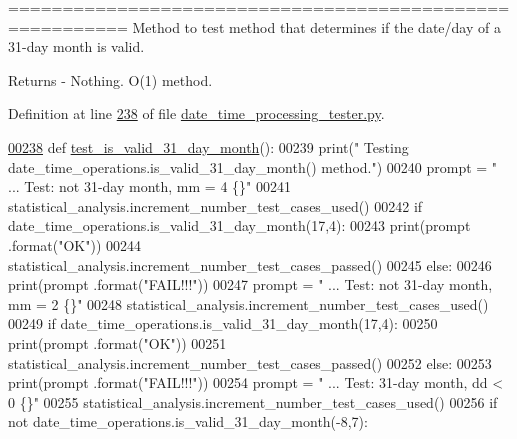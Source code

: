 ========================================================= Method to test method that determines if the date/day of a 31-\/day month is valid. 

\begin{DoxyReturn}{Returns}
-\/ Nothing. O(1) method. 
\end{DoxyReturn}


Definition at line \hyperlink{date__time__processing__tester_8py_source_l00238}{238} of file \hyperlink{date__time__processing__tester_8py_source}{date\+\_\+time\+\_\+processing\+\_\+tester.\+py}.


\begin{DoxyCode}
\hypertarget{classutilities_1_1date__time__processing__tester_1_1date__time__operations__tester_l00238}{}\hyperlink{classutilities_1_1date__time__processing__tester_1_1date__time__operations__tester_a6ee9fbb6e07f1ca66334315e61876d8e}{00238}     \textcolor{keyword}{def }\hyperlink{classutilities_1_1date__time__processing__tester_1_1date__time__operations__tester_a6ee9fbb6e07f1ca66334315e61876d8e}{test\_is\_valid\_31\_day\_month}():
00239         print(\textcolor{stringliteral}{" Testing date\_time\_operations.is\_valid\_31\_day\_month() method."})
00240         prompt = \textcolor{stringliteral}{"  ... Test: not 31-day month, mm = 4          \{\}"}
00241         statistical\_analysis.increment\_number\_test\_cases\_used()
00242         \textcolor{keywordflow}{if} date\_time\_operations.is\_valid\_31\_day\_month(17,4):
00243             print(prompt .format(\textcolor{stringliteral}{"OK"}))
00244             statistical\_analysis.increment\_number\_test\_cases\_passed()
00245         \textcolor{keywordflow}{else}:
00246             print(prompt .format(\textcolor{stringliteral}{"FAIL!!!"}))
00247         prompt = \textcolor{stringliteral}{"  ... Test: not 31-day month, mm = 2          \{\}"}
00248         statistical\_analysis.increment\_number\_test\_cases\_used()
00249         \textcolor{keywordflow}{if} date\_time\_operations.is\_valid\_31\_day\_month(17,4):
00250             print(prompt .format(\textcolor{stringliteral}{"OK"}))
00251             statistical\_analysis.increment\_number\_test\_cases\_passed()
00252         \textcolor{keywordflow}{else}:
00253             print(prompt .format(\textcolor{stringliteral}{"FAIL!!!"}))
00254         prompt = \textcolor{stringliteral}{"  ... Test: 31-day month, dd < 0              \{\}"}
00255         statistical\_analysis.increment\_number\_test\_cases\_used()
00256         \textcolor{keywordflow}{if} \textcolor{keywordflow}{not} date\_time\_operations.is\_valid\_31\_day\_month(-8,7):

\end{DoxyCode}

